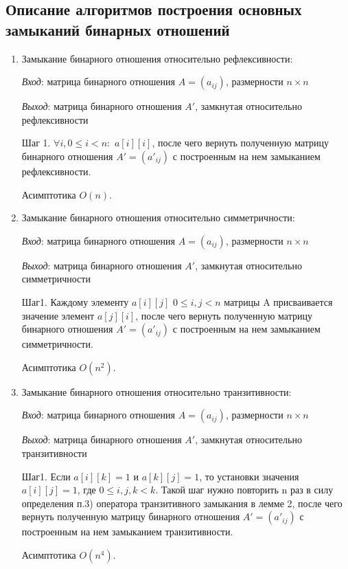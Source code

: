 \documentclass[spec, och, labwork]{shiza}
\begin{document}
        \subsection{Описание алгоритмов построения основных замыканий бинарных отношений}
            \begin{enumerate}
                
                \item Замыкание бинарного отношения относительно рефлексивности:
                
                \textit{Вход}: матрица бинарного отношения $A = (a_{ij})$, размерности $n \times n$

                \textit{Выход}: матрица бинарного отношения $A'$, замкнутая относительно рефлексивности

                Шаг 1. $\forall i, 0 \leq i < n:$ $a[i][i]$, после чего вернуть полученную матрицу бинарного отношения $A'=(a'_{ij})$ с построенным на нем замыканием рефлексивности.

                Асимптотика $O(n)$.

                \item Замыкание бинарного отношения относительно симметричности:
                
                \textit{Вход}: матрица бинарного отношения $A = (a_{ij})$, размерности $n \times n$

                \textit{Выход}: матрица бинарного отношения $A'$, замкнутая относительно симметричности

                Шаг1. Каждому элементу $a[i][j]$ $0 \leq i, j < n$ матрицы A присваивается значение элемент
                $a[j][i]$, после чего вернуть полученную матрицу бинарного отношения $A'=(a'_{ij})$ с построенным на нем замыканием симметричности.

                Асимптотика $O(n^2)$.

                \item Замыкание бинарного отношения относительно транзитивности:
                
                \textit{Вход}: матрица бинарного отношения $A = (a_{ij})$, размерности $n \times n$

                \textit{Выход}: матрица бинарного отношения $A'$, замкнутая относительно транзитивности

                Шаг1. Если $a[i][k] = 1$ и $a[k][j] = 1$, то установки значения $a[i][j] = 1$, где $0 \leq i,j,k < k$. Такой шаг нужно повторить n раз
                в силу определения п.3) оператора транзитивного замыкания в лемме 2, после чего вернуть полученную матрицу бинарного отношения $A'=(a'_{ij})$ с построенным на нем замыканием транзитивности.

                Асимптотика $O(n^4)$.
            \end{enumerate}
    
\end{document}
